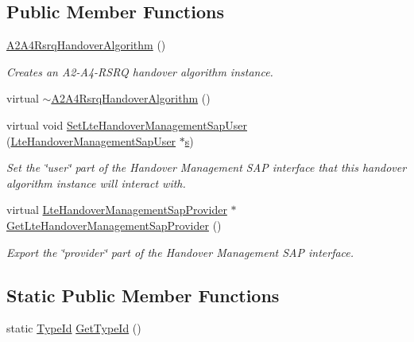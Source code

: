 \subsection*{Public Member Functions}
\begin{DoxyCompactItemize}
\item 
\hyperlink{classns3_1_1A2A4RsrqHandoverAlgorithm_a4ddb6f19752cdf9b5db9d98ec0888a5c}{A2\+A4\+Rsrq\+Handover\+Algorithm} ()
\begin{DoxyCompactList}\small\item\em Creates an A2-\/\+A4-\/\+R\+S\+RQ handover algorithm instance. \end{DoxyCompactList}\item 
virtual \hyperlink{classns3_1_1A2A4RsrqHandoverAlgorithm_ab199f6eec6267db06ed58a162eb68a1d}{$\sim$\+A2\+A4\+Rsrq\+Handover\+Algorithm} ()
\item 
virtual void \hyperlink{classns3_1_1A2A4RsrqHandoverAlgorithm_aa0800422eef0bbf24cd4a38991973fe0}{Set\+Lte\+Handover\+Management\+Sap\+User} (\hyperlink{classns3_1_1LteHandoverManagementSapUser}{Lte\+Handover\+Management\+Sap\+User} $\ast$\hyperlink{generate__test__data__lte__sinr_8m_ad83eeb3a142285d1243a08c6b7026df8}{s})
\begin{DoxyCompactList}\small\item\em Set the \char`\"{}user\char`\"{} part of the Handover Management S\+AP interface that this handover algorithm instance will interact with. \end{DoxyCompactList}\item 
virtual \hyperlink{classns3_1_1LteHandoverManagementSapProvider}{Lte\+Handover\+Management\+Sap\+Provider} $\ast$ \hyperlink{classns3_1_1A2A4RsrqHandoverAlgorithm_accacf1f5305c5d210dc41c64f0ae1f6a}{Get\+Lte\+Handover\+Management\+Sap\+Provider} ()
\begin{DoxyCompactList}\small\item\em Export the \char`\"{}provider\char`\"{} part of the Handover Management S\+AP interface. \end{DoxyCompactList}\end{DoxyCompactItemize}
\subsection*{Static Public Member Functions}
\begin{DoxyCompactItemize}
\item 
static \hyperlink{classns3_1_1TypeId}{Type\+Id} \hyperlink{classns3_1_1A2A4RsrqHandoverAlgorithm_a0185c791e561824abf4506ee551375dd}{Get\+Type\+Id} ()
\end{DoxyCompactItemize}

